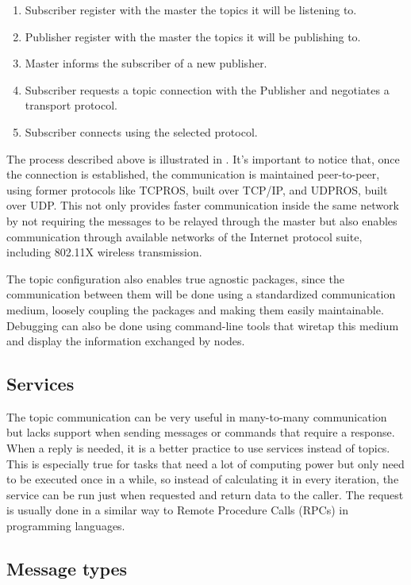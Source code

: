 \begin{enumerate}
\item Subscriber register with the master the topics it will be listening to.
\item Publisher register with the master the topics it will be publishing to.
\item Master informs the subscriber of a new publisher.
\item Subscriber requests a topic connection with the Publisher and negotiates a transport protocol.
\item Subscriber connects using the selected protocol.
\end{enumerate}

The process described above is illustrated in . It's important to notice that, once the connection is established, the communication is maintained peer-to-peer, using former protocols like TCPROS, built over TCP/IP, and UDPROS, built over UDP. This not only provides faster communication inside the same network by not requiring the messages to be relayed through the master but also enables communication through available networks of the Internet protocol suite, including 802.11X wireless transmission.

The topic configuration also enables true agnostic packages, since the communication between them will be done using a standardized communication medium, loosely coupling the packages and making them easily maintainable. Debugging can also be done using command-line tools that wiretap this medium and display the information exchanged by nodes.

\subsection{Services}

The topic communication can be very useful in many-to-many communication but lacks support when sending messages or commands that require a response. When a reply is needed, it is a better practice to use services instead of topics. This is especially true for tasks that need a lot of computing power but only need to be executed once in a while, so instead of calculating it in every iteration, the service can be run just when requested and return data to the caller. The request is usually done in a similar way to Remote Procedure Calls (RPCs) in programming languages.

\subsection{Message types}


